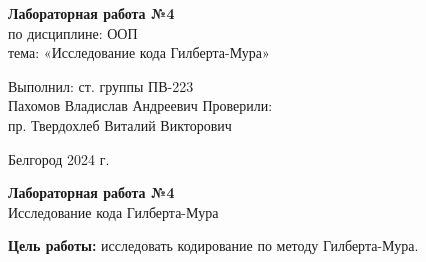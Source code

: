 \documentclass[a4paper,14pt]{extarticle}
\newcommand\textbox[1]{
	\parbox{.45\textwidth}{#1}
}
\begin{document}
\vfill
\begin{center}
    \large{
        \textbf{
            Лабораторная работа №4}}\\
    \normalsize{
        по дисциплине: ООП \\
        тема: «Исследование кода Гилберта-Мура»}
\end{center}
\vfill
\hfill\textbox{
    Выполнил: ст. группы ПВ-223\\Пахомов Владислав Андреевич
    \bigbreak
    Проверили: \\пр. Твердохлеб Виталий Викторович
}
\vfill\begin{center}
    Белгород 2024 г.
\end{center}
\newpage
\begin{center}
    \textbf{Лабораторная работа №4}\\
    Исследование кода Гилберта-Мура\\
\end{center}
\textbf{Цель работы: }исследовать кодирование по методу Гилберта-Мура.\\
\end{document}

